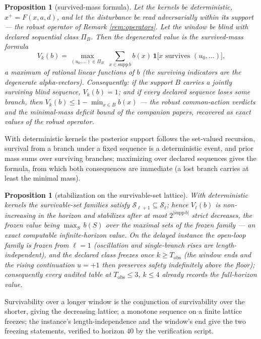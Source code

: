 \documentclass[10pt,twocolumn]{article}
\theoremstyle{plain}
\newtheorem{proposition}[theorem]{Proposition}
\theoremstyle{definition}
\theoremstyle{remark}
\begin{document}
\begin{proposition}[survived-mass formula]\label{prop:degen}
Let the kernels be deterministic, \(x^{+} = F(x, a, d)\), and let the
disturbance be read adversarially within its support --- the robust
operator of Remark \ref{rem:operators}. Let the window be blind with
declared sequential class \(\Pi_{B}\). Then the degenerated value is the
\emph{survived-mass formula}
\[
V_{k}(b) = \max_{(u_{0},\dots) \in \Pi_{B}}\;
\sum_{x \in \mathrm{supp}\, b} b(x)\,
\mathbf{1}\bigl[ x \text{ survives } (u_{0}, \dots) \bigr],
\]
a maximum of rational linear functions of \(b\) (the surviving indicators
are the degenerate alpha-vectors). Consequently: if the support \(B\)
carries a jointly surviving blind sequence, \(V_{k}(b) = 1\); and if every
declared sequence loses some branch, then
\(V_{k}(b) \le 1 - \min_{x \in B} b(x)\) --- the robust common-action
verdicts and the minimal-mass deficit bound of the companion papers,
recovered as exact values of the robust operator.
\end{proposition}

With deterministic kernels the posterior support follows the set-valued
recursion, survival from a branch under a fixed sequence is a
deterministic event, and prior mass sums over surviving branches;
maximizing over declared sequences gives the formula, from which both
consequences are immediate (a lost branch carries at least the minimal
mass).

\begin{proposition}[stabilization on the survivable-set lattice]\label{prop:freeze}
With deterministic kernels the survivable-set families satisfy
\(\mathcal{S}_{\ell+1} \subseteq \mathcal{S}_{\ell}\); hence
\(V_{\ell}(b)\) is non-increasing in the horizon and stabilizes after
at most \(2^{|\mathrm{supp}\, b|}\) strict decreases, the frozen value
being \(\max_{S}\, b(S)\) over the maximal sets of the frozen family
--- an exact computable infinite-horizon value. On the delayed instance
the open-loop family is frozen from \(\ell = 1\) (oscillation and
single-branch rises are length-independent), and the declared class
freezes once \(k \ge T_{\mathrm{obs}}\) (the window ends and the
rising continuation \(u = +1\) then preserves safety indefinitely
above the floor); consequently every audited table at
\(T_{\mathrm{obs}} \le 3\), \(k \le 4\) already records the
full-horizon value.
\end{proposition}

Survivability over a longer window is the conjunction of survivability
over the shorter, giving the decreasing lattice; a monotone sequence on a
finite lattice freezes; the instance's length-independence and the
window's end give the two freezing statements, verified to horizon
\(40\) by the verification script.
\end{document}
